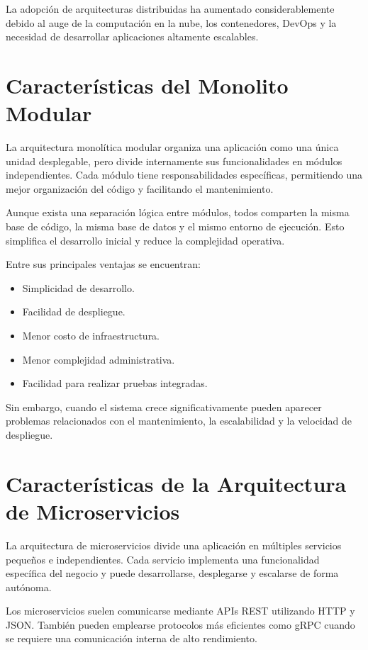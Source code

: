 \documentclass[12pt,a4paper]{article}
\begin{document}
La adopción de arquitecturas distribuidas ha aumentado considerablemente debido al auge de la computación en la nube, los contenedores, DevOps y la necesidad de desarrollar aplicaciones altamente escalables.

\section{Características del Monolito Modular}

La arquitectura monolítica modular organiza una aplicación como una única unidad desplegable, pero divide internamente sus funcionalidades en módulos independientes. Cada módulo tiene responsabilidades específicas, permitiendo una mejor organización del código y facilitando el mantenimiento.

Aunque exista una separación lógica entre módulos, todos comparten la misma base de código, la misma base de datos y el mismo entorno de ejecución. Esto simplifica el desarrollo inicial y reduce la complejidad operativa.

Entre sus principales ventajas se encuentran:

\begin{itemize}
\item Simplicidad de desarrollo.
\item Facilidad de despliegue.
\item Menor costo de infraestructura.
\item Menor complejidad administrativa.
\item Facilidad para realizar pruebas integradas.
\end{itemize}

Sin embargo, cuando el sistema crece significativamente pueden aparecer problemas relacionados con el mantenimiento, la escalabilidad y la velocidad de despliegue.

\section{Características de la Arquitectura de Microservicios}

La arquitectura de microservicios divide una aplicación en múltiples servicios pequeños e independientes. Cada servicio implementa una funcionalidad específica del negocio y puede desarrollarse, desplegarse y escalarse de forma autónoma.

Los microservicios suelen comunicarse mediante APIs REST utilizando HTTP y JSON. También pueden emplearse protocolos más eficientes como gRPC cuando se requiere una comunicación interna de alto rendimiento.
\end{document}
